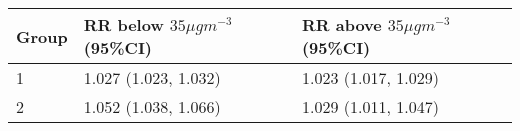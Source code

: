 \begin{tabular}{lll}
  \hline
Group & RR below $35 \mu g m^{-3}$ (95\%CI) & RR above $35 \mu g m^{-3}$ (95\%CI) \\ 
  \hline
   1 & 1.027 (1.023, 1.032) & 1.023 (1.017, 1.029) \\ 
     2 & 1.052 (1.038, 1.066) & 1.029 (1.011, 1.047) \\ 
   \hline
\end{tabular}

